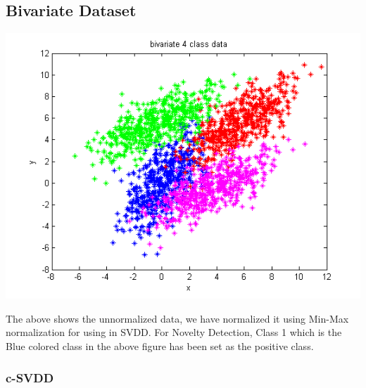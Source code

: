 \documentclass{article}
\begin{document}
\subsection{Bivariate Dataset}
\begin{center}
\includegraphics[scale=.6]{SVDD/bivar}
\end{center}
The above shows the unnormalized data, we have normalized it using Min-Max normalization for using in SVDD. For Novelty Detection, Class 1 which is the Blue colored class in the above figure has been set as the positive class.



\subsubsection{c-SVDD}
\end{document}
